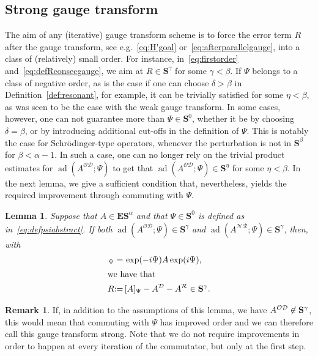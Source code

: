 \documentclass[10pt]{amsart}
\newtheorem{lemm}[theo]{Lemma}\newtheorem{prop}[theo]{Proposition}\newtheorem{coro}[theo]{Corollary}\newtheorem{conj}[theo]{Conjecture}
\theoremstyle{definition}\newtheorem{defi}[theo]{Definition}\newtheorem{rema}[theo]{Remark}\newtheorem{exam}[theo]{Example}\newtheorem{nota}[theo]{Notation}
\DeclareMathOperator{\ad}{ad}
\newcommand{\CD}{\mathcal{D}}
\newcommand{\CN}{\mathcal{N}}
\newcommand{\CO}{\mathcal{O}}
\newcommand{\CR}{\mathcal{R}}
\newcommand{\COD}{{\CO\CD}}
\newcommand{\CNR}{{\CN\!\CR}}
\newcommand{\BE}{\mathbf E}
\newcommand{\BS}{\mathbf S}
\begin{document}
\subsection{Strong gauge transform} \label{sec:sgt}
The aim of any (iterative) gauge transform scheme is to force the error term $R$ after the gauge transform, see e.g.~\eqref{eq:H'goal} or~\eqref{eq:afterparallelgauge}, into a class of (relatively) small order. For instance, in~\eqref{eq:firstorder} and~\eqref{eq:defRconsecgauge}, we aim at $R \in \BS^\gamma$ for some $\gamma < \beta$. If $\Psi$ belongs to a class of negative order, as is the case if one can choose $\delta > \beta$ in Definition~\ref{def:resonant}, for example, it can be trivially satisfied for some $\eta<\beta$, as was seen to be the case with the weak gauge transform. In some cases, however, one can not guarantee more than $\Psi \in \BS^0$, whether it be by choosing $\delta = \beta$, or by introducing additional cut-offs in the definition of $\Psi$. This is notably the case for Schr\"odinger-type operators, whenever the perturbation is not in $\BS^\beta$ for $\beta < \alpha - 1$. In such a case, one can no longer rely on the trivial product estimates for $\ad(A^{\COD};\Psi)$ to get that $\ad(A^{\COD};\Psi)\in\BS^\eta$ for some $\eta<\beta$. In the next lemma, we give a sufficient condition that, nevertheless, yields the required improvement through commuting with $\Psi$.


\begin{lemm}\label{lem:sgt}
Suppose that $A \in \BE\BS^\alpha$ and that $\Psi \in \BS^0$ is defined as in~\eqref{eq:defpsiabstract}. If both $\ad(A^{\CO\CD};\Psi) \in \BS^{\gamma}$ and $\ad(A^{\CNR};\Psi) \in \BS^{\gamma}$, then, with
\begin{align*}
[A]_\Psi =&\, \exp(-i\Psi) A \exp(i\Psi),
\\
\intertext{we have that}
R {:=}&\,[A]_\Psi - A^{\CD} - A^{\CR} \in \BS^{\gamma}.
\end{align*}
\end{lemm}
\begin{rema}
If, in addition to the assumptions of this lemma, we have $A^{\CO\CD} \linebreak\not \in\BS^{\gamma}$, this would mean that commuting with $\Psi$ has improved order and we can therefore call this gauge transform strong. Note that we do not require improvements in order to happen at every iteration of the commutator, but only at the first step.
\end{rema}
\end{document}

